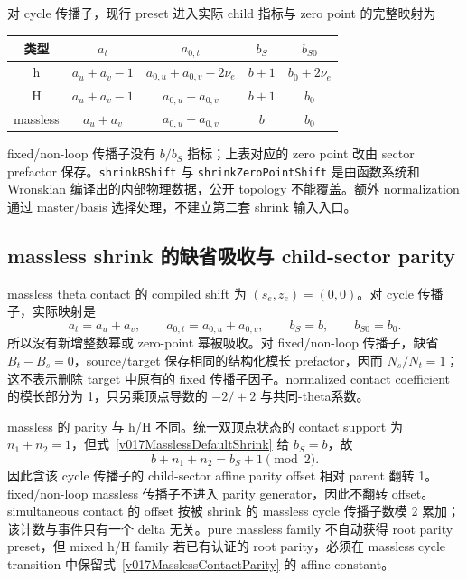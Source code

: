 ﻿\documentclass[a4paper,11pt]{article}
\begin{document}
对 cycle 传播子，现行 preset 进入实际 child 指标与 zero point 的完整映射为
\begin{center}
\small
\begin{tabular}{c|c|c|c|c}
 类型 & $a_t$ & $a_{0,t}$ & $b_S$ & $b_{S0}$\\ \hline
 h & $a_u+a_v-1$ & $a_{0,u}+a_{0,v}-2\nu_e$ & $b+1$ & $b_0+2\nu_e$\\
 H & $a_u+a_v-1$ & $a_{0,u}+a_{0,v}$ & $b+1$ & $b_0$\\
 massless & $a_u+a_v$ & $a_{0,u}+a_{0,v}$ & $b$ & $b_0$
\end{tabular}
\end{center}
fixed/non-loop 传播子没有 $b/b_S$ 指标；上表对应的 zero point 改由 sector prefactor 保存。\texttt{shrinkBShift} 与 \texttt{shrinkZeroPointShift} 是由函数系统和 Wronskian 编译出的内部物理数据，公开 topology 不能覆盖。额外 normalization 通过 master/basis 选择处理，不建立第二套 shrink 输入入口。

\subsection{massless shrink 的缺省吸收与 child-sector parity}

massless theta contact 的 compiled shift 为 $(s_e,z_e)=(0,0)$。对 cycle 传播子，实际映射是
\begin{equation}
 a_t=a_u+a_v,\qquad a_{0,t}=a_{0,u}+a_{0,v},\qquad
 b_S=b,\qquad b_{S0}=b_0.
 \label{v017MasslessDefaultShrink}
\end{equation}
所以没有新增整数幂或 zero-point 幂被吸收。对 fixed/non-loop 传播子，缺省 $B_t-B_s=0$，source/target 保存相同的结构化模长 prefactor，因而 $N_s/N_t=1$；这不表示删除 target 中原有的 fixed 传播子因子。normalized contact coefficient 的模长部分为 1，只另乘顶点导数的 $-2/+2$ 与共同-theta系数。

massless 的 parity 与 h/H 不同。统一双顶点状态的 contact support 为 $n_1+n_2=1$，但式~\eqref{v017MasslessDefaultShrink} 给 $b_S=b$，故
\begin{equation}
 b+n_1+n_2=b_S+1\pmod 2.
 \label{v017MasslessContactParity}
\end{equation}
因此含该 cycle 传播子的 child-sector affine parity offset 相对 parent 翻转 1。fixed/non-loop massless 传播子不进入 parity generator，因此不翻转 offset。simultaneous contact 的 offset 按被 shrink 的 massless cycle 传播子数模 2 累加；该计数与事件只有一个 delta 无关。pure massless family 不自动获得 root parity preset，但 mixed h/H family 若已有认证的 root parity，必须在 massless cycle transition 中保留式~\eqref{v017MasslessContactParity} 的 affine constant。
\end{document}
